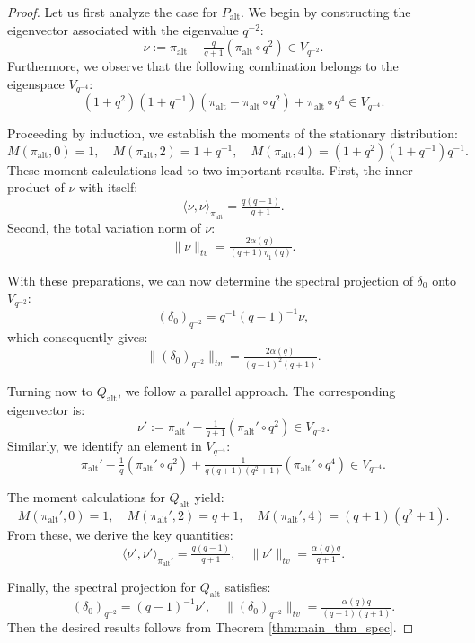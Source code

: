 \documentclass[10pt,a4paper]{amsart}
\newcommand{\alt}{{\mathrm{alt}}}
\begin{document}
\begin{proof}
Let us first analyze the case for $P_\alt$. We begin by constructing the eigenvector associated with the eigenvalue $q^{-2}$:
\[
\nu := \pi_\alt - \tfrac{q}{q+1}(\pi_\alt \circ q^2) \in V_{q^{-2}}.
\]
Furthermore, we observe that the following combination belongs to the eigenspace $V_{q^{-4}}$:
\[
(1+q^2)(1+q^{-1})(\pi_\alt-\pi_\alt\circ q^2)+\pi_\alt\circ q^4 \in V_{q^{-4}}.
\]

Proceeding by induction, we establish the moments of the stationary distribution:
\[
M(\pi_\alt, 0) = 1, \quad M(\pi_\alt, 2) = 1 + q^{-1}, \quad M(\pi_\alt, 4) = (1+q^2)(1+q^{-1})q^{-1}.
\]
These moment calculations lead to two important results. First, the inner product of $\nu$ with itself:
\[
\langle \nu, \nu \rangle_{\pi_\alt} = \tfrac{q(q-1)}{q+1}.
\]
Second, the total variation norm of $\nu$:
\[
\|\nu\|_{tv} = \tfrac{2\alpha(q)}{(q+1)\eta_1(q)}.
\]

With these preparations, we can now determine the spectral projection of $\delta_0$ onto $V_{q^{-2}}$:
\[
(\delta_0)_{q^{-2}} = q^{-1}(q-1)^{-1} \nu,
\]
which consequently gives:
\[
\|(\delta_0)_{q^{-2}}\|_{tv} = \tfrac{2\alpha(q)}{(q-1)^2(q+1)}.
\]

Turning now to $Q_\alt$, we follow a parallel approach. The corresponding eigenvector is:
\[
\nu' := \pi_\alt' - \tfrac{1}{q+1}(\pi_\alt' \circ q^2) \in V_{q^{-2}}.
\]
Similarly, we identify an element in $V_{q^{-4}}$:
\[
\pi_\alt'-\tfrac{1}{q}(\pi_\alt'\circ q^2)+\tfrac{1}{q(q+1)(q^2+1)}(\pi_\alt'\circ q^4) \in V_{q^{-4}}.
\]

The moment calculations for $Q_\alt$ yield:
\[
M(\pi_\alt', 0) = 1, \quad M(\pi_\alt', 2) = q+1, \quad M(\pi_\alt', 4) = (q+1)(q^2+1).
\]
From these, we derive the key quantities:
\[
\langle \nu', \nu' \rangle_{\pi_\alt'} = \tfrac{q(q-1)}{q+1}, \quad \|\nu'\|_{tv} = \tfrac{\alpha(q) q}{q+1}.
\]

Finally, the spectral projection for $Q_\alt$ satisfies:
\[
(\delta_0)_{q^{-2}} = (q-1)^{-1} \nu', \quad \|(\delta_0)_{q^{-2}}\|_{tv} = \tfrac{\alpha(q) q}{(q-1)(q+1)}.
\]
Then the desired results follows from Theorem \ref{thm:main_thm_spec}.
\end{proof}
\end{document}
